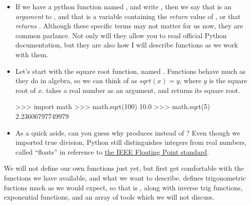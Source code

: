 \begin{itemize}
    \item If we have a python function named , and write , then we say that  is an \emph{argument} to , and that  is a variable containing the \emph{return} value of , or that  \emph{returns} .
        Although these specific terms may not matter for us now, they are common parlance.
        Not only will they allow you to read official Python documentation, but they are also how I will describe functions as we work with them.
    \item Let's start with the square root function, named .
        Functions behave much as they do in algebra, so we can think of  as $sqrt(x) = y$, where $y$ is the square root of $x$.
         takes a real number as an argument, and returns its square root.
\begin{codeblock}
>>> import math
>>> math.sqrt(100)
10.0
>>> math.sqrt(5)
2.23606797749979
\end{codeblock}
    \item As a quick aside, can you guess why  produces  instead of ?
        Even though we imported true division, Python still distinguishes integers from real numbers, called ``floats'' in reference to \href{http://en.wikipedia.org/wiki/IEEE\%5Ffloating\%5Fpoint}{the IEEE Floating Point standard}.
\end{itemize}

We will not define our own functions just yet, but first get comfortable with the functions we have available, and what we want to describe.
 defines trigonometric fuctions much as we would expect, so that  is , along with inverse trig functions, exponential functions, and an array of tools which we will not discuss.

